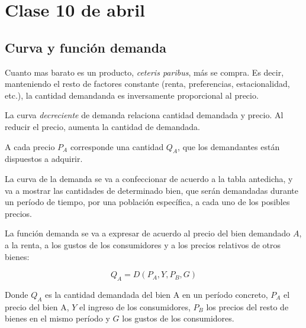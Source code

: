 \section{Clase 10 de abril}

\subsection{Curva y función demanda}

Cuanto mas barato es un producto,
\textit{ceteris paribus},
más se compra.
Es decir,
manteniendo el resto de factores constante
(renta, preferencias, estacionalidad, etc.),
la cantidad demandanda es inversamente proporcional al precio.

La curva \textit{decreciente} de demanda relaciona cantidad demandada y precio.
Al reducir el precio,
aumenta la cantidad de demandada.

A cada precio \(P_A\) corresponde una cantidad \(Q_A\),
que los demandantes están dispuestos a adquirir.

La curva de la demanda se va a confeccionar de acuerdo a la tabla antedicha,
y va a mostrar las cantidades de determinado bien,
que serán demandadas durante un período de tiempo,
por una población específica,
a cada uno de los posibles precios.

La función demanda se va a expresar de acuerdo al precio del bien demandado \(A\),
a la renta,
a los gustos de los consumidores
y a los precios relativos de otros bienes:

\begin{equation*}
    Q_A = D(P_A, Y, P_B, G)
\end{equation*}

Donde \(Q_A\) es la cantidad demandada del bien A en un período concreto,
\(P_A\) el precio del bien A,
\(Y\) el ingreso de los consumidores,
\(P_B\) los precios del resto de bienes en el mismo período
y \(G\) los gustos de los consumidores.

\begin{center}
\end{center}


